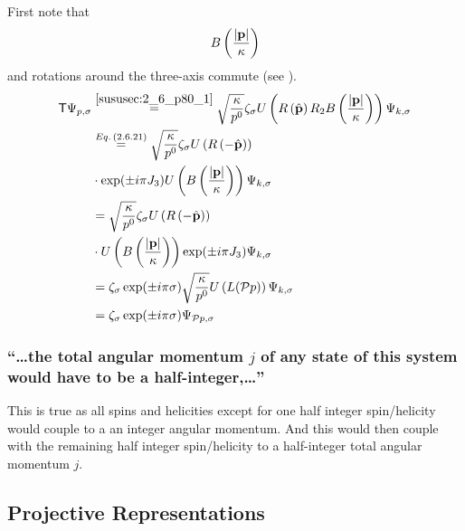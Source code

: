 \subsubsection{ }
First note that \[B\left(\dfrac{\abs{\mathbf{p}}}{\kappa}\right)\] and rotations around the three-axis commute (see ).
\begin{align*} 
	\mathsf{T}\Psi_{p,\sigma}&\overset{\ref{sususec:2_6_p80_1}}{=}\sqrt{\dfrac{\kappa}{p^0}}\zeta_\sigma U\left( R\left(\hat{\mathbf{p}}\right)R_2  B\left(\dfrac{\abs{\mathbf{p}}}{\kappa}\right)\right)\Psi_{k,\sigma}\\
	&\overset{Eq.\,({2.6.21})}{=}\sqrt{\dfrac{\kappa}{p^0}}\zeta_\sigma U\left( R\left(-\hat{\mathbf{p}}\right)\right)\\
	&\cdot\exp(\pm i \pi J_3)U\left(  B\left(\dfrac{\abs{\mathbf{p}}}{\kappa}\right)\right)\Psi_{k,\sigma}\\
	&=\sqrt{\dfrac{\kappa}{p^0}}\zeta_\sigma U\left( R\left(-\hat{\mathbf{p}}\right)\right)\\
	&\cdot U\left(  B\left(\dfrac{\abs{\mathbf{p}}}{\kappa}\right)\right)\exp(\pm i \pi J_3)\Psi_{k,\sigma}\\
	&=\zeta_\sigma \exp(\pm i \pi \sigma) \sqrt{\dfrac{\kappa}{p^0}}U\left(L(\mathcal{\mathcal{P}} p)\right)\Psi_{k,\sigma}\\
	&=\zeta_\sigma \exp(\pm i \pi \sigma) \Psi_{\mathcal{\mathcal{P}} p,\sigma}
\end{align*}

\subsubsection{\enquote{\dots the total angular momentum $j$ of any state of this system would have to be a half-integer,\dots} }
This is true as all spins and helicities except for one half integer spin/helicity would couple to a an integer angular momentum. And this would then couple with the remaining half integer spin/helicity to a half-integer total angular momentum $j$.


\subsection{Projective Representations}\label{susec:2_7}
